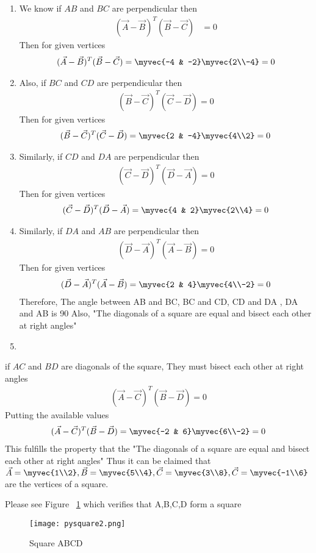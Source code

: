 \documentclass[journal,12pt,twocolumn]{IEEEtran}
\begin{document}
\begin{enumerate}
\item
We know if $AB$ and $BC$ are perpendicular then
\begin{align}
(\vec{A}-\vec{B})^T(\vec{B}-\vec{C})&=0
\end{align}
Then for given vertices 
\begin{align}
(\vec{A}-\vec{B})^T(\vec{B}-\vec{C})=\myvec {-4 & -2}\myvec {2\\-4} = 0
\end{align}
\item
Also, if $BC$ and $CD$ are perpendicular then
\begin{align}
(\vec{B}-\vec{C})^T(\vec{C}-\vec{D})=0
\end{align}
Then for given vertices 
\begin{align}
(\vec{B}-\vec{C})^T(\vec{C}-\vec{D})=\myvec {2 & -4}\myvec {4\\2}= 0
\end{align}
\item 
Similarly, if $CD$ and $DA$ are perpendicular then
\begin{align}
(\vec{C}-\vec{D})^T (\vec{D}-\vec{A}) =0
\end{align}
Then for given vertices 
\begin{align}
(\vec{C}-\vec{D})^T (\vec{D}-\vec{A})=\myvec {4 & 2}\myvec {2\\4} = 0
\end{align}
\item
Similarly, if $DA$ and $AB$ are perpendicular then
\begin{align}
(\vec{D}-\vec{A})^T (\vec{A}-\vec{B})=0
\end{align}
Then for given vertices 
\begin{align}
(\vec{D}-\vec{A})^T (\vec{A}-\vec{B})=\myvec {2 & 4}\myvec {4\\-2}= 0
\end{align}
Therefore, The angle between AB and BC, BC and CD, CD and DA , DA and AB is 90\degree
Also, "The diagonals of a square are equal and bisect each other at right angles"
\item 
\end{enumerate}
if $AC$ and $BD$ are diagonals of the square, They must bisect each other at right angles
\begin{align}
(\vec{A}-\vec{C})^T (\vec{B}-\vec{D})=0
\end{align}
Putting the available values
\begin{align}
(\vec{A}-\vec{C})^T (\vec{B}-\vec{D})=\myvec {-2 & 6}\myvec {6\\-2}= 0
\end{align}
This fulfills the property that the "The diagonals of a square are equal and bisect each other at right angles" 
Thus it can be claimed that $\vec {A}=\myvec {1\\2},
\vec {B}=\myvec {5\\4},
\vec {C}=\myvec {3\\8},
\vec {C}=\myvec {-1\\6}$ are the vertices of a square.
   
Please see Figure ~\ref{fig:Square ABCD} which verifies that
A,B,C,D form a square
\begin{figure}[h!]
\texttt{[image: pysquare2.png]}
  \caption{Square ABCD}
  \label{fig:Square ABCD}
\end{figure}
\end{document}
